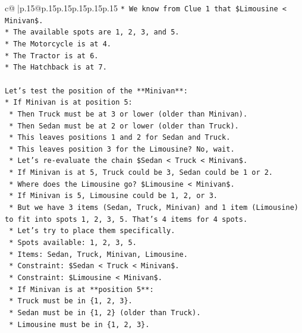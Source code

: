 \documentclass{article}
\begin{document}
{\begin{supertabular}{c@{$\;$}|p{.15\linewidth}@{}p{.15\linewidth}p{.15\linewidth}p{.15\linewidth}p{.15\linewidth}p{.15\linewidth}}
{{{\texttt{*   We know from Clue 1 that \$Limousine < Minivan\$.} \\
\texttt{*   The available spots are 1, 2, 3, and 5.} \\
\texttt{*   The Motorcycle is at 4.} \\
\texttt{*   The Tractor is at 6.} \\
\texttt{*   The Hatchback is at 7.} \\
\\ 
\texttt{Let's test the position of the **Minivan**:} \\
\texttt{*   If Minivan is at position 5:} \\
\texttt{    *   Then Truck must be at 3 or lower (older than Minivan).} \\
\texttt{    *   Then Sedan must be at 2 or lower (older than Truck).} \\
\texttt{    *   This leaves positions 1 and 2 for Sedan and Truck.} \\
\texttt{    *   This leaves position 3 for the Limousine? No, wait.} \\
\texttt{    *   Let's re{-}evaluate the chain \$Sedan < Truck < Minivan\$.} \\
\texttt{    *   If Minivan is at 5, Truck could be 3, Sedan could be 1 or 2.} \\
\texttt{    *   Where does the Limousine go? \$Limousine < Minivan\$.} \\
\texttt{    *   If Minivan is 5, Limousine could be 1, 2, or 3.} \\
\texttt{    *   But we have 3 items (Sedan, Truck, Minivan) and 1 item (Limousine) to fit into spots 1, 2, 3, 5. That's 4 items for 4 spots.} \\
\texttt{    *   Let's try to place them specifically.} \\
\texttt{    *   Spots available: 1, 2, 3, 5.} \\
\texttt{    *   Items: Sedan, Truck, Minivan, Limousine.} \\
\texttt{    *   Constraint: \$Sedan < Truck < Minivan\$.} \\
\texttt{    *   Constraint: \$Limousine < Minivan\$.} \\
\texttt{    *   If Minivan is at **position 5**:} \\
\texttt{        *   Truck must be in \{1, 2, 3\}.} \\
\texttt{        *   Sedan must be in \{1, 2\} (older than Truck).} \\
\texttt{        *   Limousine must be in \{1, 2, 3\}.} \\
}}}
\end{supertabular}}
\end{document}
